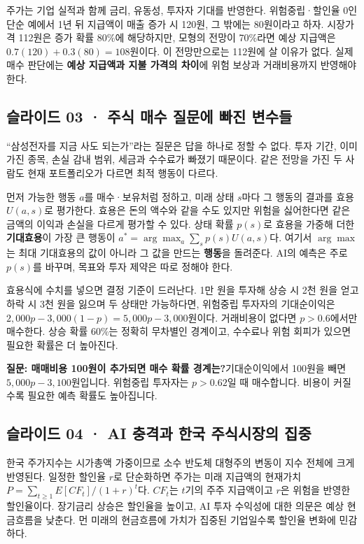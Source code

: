 \documentclass[11pt,a4paper]{article}
\begin{document}
주가는 기업 실적과 함께 금리, 유동성, 투자자 기대를 반영한다. 위험중립·할인율 0인 단순 예에서 1년 뒤 지급액이 매출 증가 시 120원, 그 밖에는 80원이라고 하자. 시장가격 112원은 증가 확률 80\%에 해당하지만, 모형의 전망이 70\%라면 예상 지급액은 $0.7(120)+0.3(80)=108$원이다. 이 전망만으로는 112원에 살 이유가 없다. 실제 매수 판단에는 \textbf{예상 지급액과 지불 가격의 차이}에 위험 보상과 거래비용까지 반영해야 한다.\par

\subsection{슬라이드 03 · 주식 매수 질문에 빠진 변수들}
“삼성전자를 지금 사도 되는가”라는 질문은 답을 하나로 정할 수 없다. 투자 기간, 이미 가진 종목, 손실 감내 범위, 세금과 수수료가 빠졌기 때문이다. 같은 전망을 가진 두 사람도 현재 포트폴리오가 다르면 최적 행동이 다르다.\par

먼저 가능한 행동 $a$를 매수·보유처럼 정하고, 미래 상태 $s$마다 그 행동의 결과를 효용 $U(a,s)$로 평가한다. 효용은 돈의 액수와 같을 수도 있지만 위험을 싫어한다면 같은 금액의 이익과 손실을 다르게 평가할 수 있다. 상태 확률 $p(s)$로 효용을 가중해 더한 \textbf{기대효용}이 가장 큰 행동이 $a^*=\arg\max_a\sum_s p(s)U(a,s)$다. 여기서 $\arg\max$는 최대 기대효용의 값이 아니라 그 값을 만드는 \textbf{행동}을 돌려준다. AI의 예측은 주로 $p(s)$를 바꾸며, 목표와 투자 제약은 따로 정해야 한다.\par

효용식에 수치를 넣으면 결정 기준이 드러난다. 1만 원을 투자해 상승 시 2천 원을 얻고 하락 시 3천 원을 잃으며 두 상태만 가능하다면, 위험중립 투자자의 기대순이익은 $2{,}000p-3{,}000(1-p)=5{,}000p-3{,}000$원이다. 거래비용이 없다면 $p>0.6$에서만 매수한다. 상승 확률 60\%는 정확히 무차별인 경계이고, 수수료나 위험 회피가 있으면 필요한 확률은 더 높아진다.\par

\begin{samepage}\par\medskip\noindent\textbf{질문: 매매비용 100원이 추가되면 매수 확률 경계는?}\quad 기대순이익에서 100원을 빼면 $5{,}000p-3{,}100$원입니다. 위험중립 투자자는 $p>0.62$일 때 매수합니다. 비용이 커질수록 필요한 예측 확률도 높아집니다.\par\end{samepage}

\subsection{슬라이드 04 · AI 충격과 한국 주식시장의 집중}
한국 주가지수는 시가총액 가중이므로 소수 반도체 대형주의 변동이 지수 전체에 크게 반영된다. 일정한 할인율 $r$로 단순화하면 주가는 미래 지급액의 현재가치 $P=\sum_{t\ge1}E[CF_t]/(1+r)^t$다. $CF_t$는 $t$기의 주주 지급액이고 $r$은 위험을 반영한 할인율이다. 장기금리 상승은 할인율을 높이고, AI 투자 수익성에 대한 의문은 예상 현금흐름을 낮춘다. 먼 미래의 현금흐름에 가치가 집중된 기업일수록 할인율 변화에 민감하다.\par
\end{document}
